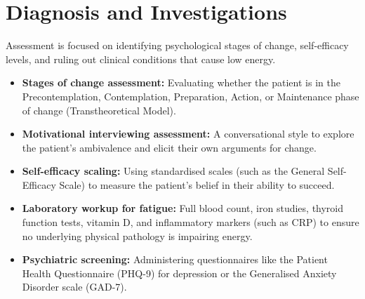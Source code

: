 \section*{Diagnosis and Investigations}
Assessment is focused on identifying psychological stages of change, self-efficacy levels, and ruling out clinical conditions that cause low energy.
\begin{itemize}
    \item \textbf{Stages of change assessment:} Evaluating whether the patient is in the Precontemplation, Contemplation, Preparation, Action, or Maintenance phase of change (Transtheoretical Model).
    \item \textbf{Motivational interviewing assessment:} A conversational style to explore the patient's ambivalence and elicit their own arguments for change.
    \item \textbf{Self-efficacy scaling:} Using standardised scales (such as the General Self-Efficacy Scale) to measure the patient's belief in their ability to succeed.
    \item \textbf{Laboratory workup for fatigue:} Full blood count, iron studies, thyroid function tests, vitamin D, and inflammatory markers (such as CRP) to ensure no underlying physical pathology is impairing energy.
    \item \textbf{Psychiatric screening:} Administering questionnaires like the Patient Health Questionnaire (PHQ-9) for depression or the Generalised Anxiety Disorder scale (GAD-7).
\end{itemize}

